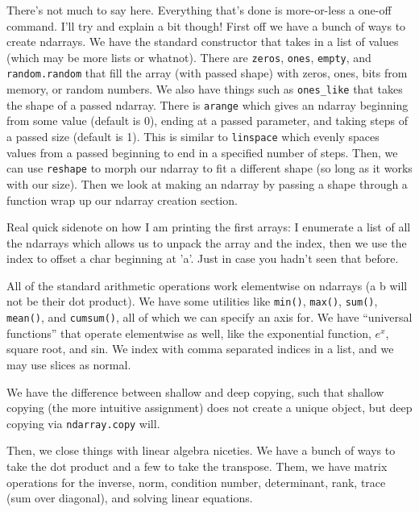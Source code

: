 \documentclass[11pt, twoside, reqno]{book}
\begin{document}
There's not much to say here. Everything that's done is more-or-less a one-off command. I'll try and explain a bit though! First off we have a bunch of ways to create ndarrays. We have the standard constructor that takes in a list of values (which may be more lists or whatnot). There are \texttt{zeros}, \texttt{ones}, \texttt{empty}, and \texttt{random.random} that fill the array (with passed shape) with zeros, ones, bits from memory, or random numbers. We also have things such as \texttt{ones\_like} that takes the shape of a passed ndarray. There is \texttt{arange} which gives an ndarray beginning from some value (default is 0), ending at a passed parameter, and taking steps of a passed size (default is 1). This is similar to \texttt{linspace} which evenly spaces values from a passed beginning to end in a specified number of steps. Then, we can use \texttt{reshape} to morph our ndarray to fit a different shape (so long as it works with our size). Then we look at making an ndarray by passing a shape through a function wrap up our ndarray creation section.

Real quick sidenote on how I am printing the first arrays: I enumerate a list of all the ndarrays which allows us to unpack the array and the index, then we use the index to offset a char beginning at 'a'. Just in case you hadn't seen that before.

All of the standard arithmetic operations work elementwise on ndarrays (a \textit{} b will not be their dot product). We have some utilities like \texttt{min()}, \texttt{max()}, \texttt{sum()}, \texttt{mean()}, and \texttt{cumsum()}, all of which we can specify an axis for. We have ``universal functions'' that operate elementwise as well, like the exponential function, $e^x$, square root, and sin. We index with comma separated indices in a list, and we may use slices as normal.

We have the difference between shallow and deep copying, such that shallow copying (the more intuitive assignment) does not create a unique object, but deep copying via \texttt{ndarray.copy} will.

Then, we close things with linear algebra niceties. We have a bunch of ways to take the dot product and a few to take the transpose. Them, we have matrix operations for the inverse, norm, condition number, determinant, rank, trace (sum over diagonal), and solving linear equations.
\end{document}

